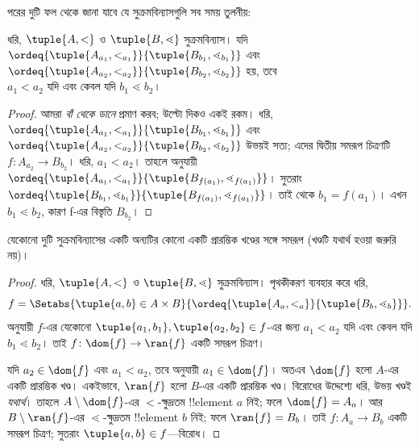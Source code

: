 \documentclass[../../../include/open-logic-section]{subfiles}
\begin{document}
পরের দুটি ফল থেকে জানা যাবে যে সুক্রমবিন্যাসগুলি
সব সময় তুলনীয়:

\begin{lem}
ধরি, $\tuple{A, <}$ ও $\tuple{B, \lessdot}$
সুক্রমবিন্যাস। যদি
$\ordeq{\tuple{A_{a_1}, <_{a_1}}}{\tuple{B_{b_1}, \lessdot_{b_1}}}$
এবং
$\ordeq{\tuple{A_{{a_2}}, <_{a_2}}}{\tuple{B_{{b_2}},
\lessdot_{b_2}}}$ হয়, তবে ${a_1}  < {a_2} \text{ যদি এবং কেবল যদি }{b_1} \lessdot
{b_2}$।
\end{lem}

\begin{proof}
আমরা \emph{বাঁ থেকে ডানে} প্রমাণ করব; উল্টো দিকও
একই রকম। ধরি,
$\ordeq{\tuple{A_{a_1}, <_{a_1}}}{\tuple{B_{b_1},
\lessdot_{b_1}}}$ এবং
$\ordeq{\tuple{A_{{a_2}},
<_{a_2}}}{\tuple{B_{{b_2}}, \lessdot_{b_2}}}$
উভয়ই সত্য; এদের দ্বিতীয় সমরূপ চিত্রণটি
$f \colon A_{{a_2}} \to B_{{b_2}}$। ধরি,
${a_1} < {a_2}$। তাহলে
 অনুযায়ী
$\ordeq{\tuple{A_{a_1}, <_{a_1}}}{\tuple{B_{f({a_1})},
\lessdot_{f({a_1})}}}$। সুতরাং
$\ordeq{\tuple{B_{b_1}, \lessdot_{b_1}}}{\tuple{B_{f({a_1})},
\lessdot_{f({a_1})}}}$। তাই
 থেকে
${b_1} = f({a_1})$। এখন
${b_1} \lessdot {b_2}$, কারণ f-এর বিস্তৃতি
$B_{{b_2}}$।
\end{proof}

\begin{thm}
যেকোনো দুটি সুক্রমবিন্যাসের একটি অন্যটির
কোনো একটি প্রারম্ভিক খণ্ডের সঙ্গে সমরূপ
(খণ্ডটি যথার্থ হওয়া জরুরি নয়)।
\end{thm}

\begin{proof}
ধরি, $\tuple{A, <}$ ও $\tuple{B, \lessdot}$
সুক্রমবিন্যাস। পৃথকীকরণ ব্যবহার করে ধরি,
\[
	f = \Setabs{\tuple{a, b} \in A \times B}{
		\ordeq{\tuple{A_a, <_a}}{\tuple{B_b, \lessdot_b}}}.
\]
 অনুযায়ী $f$-এর যেকোনো
$\tuple{a_1, b_1}, \tuple{a_2, b_2} \in f$-এর
জন্য $a_1 < a_2$ যদি এবং কেবল যদি
$b_1 \lessdot b_2$। তাই
$f \colon \dom{f} \to \ran{f}$ একটি সমরূপ
চিত্রণ।

যদি $a_2 \in \dom{f}$ এবং $a_1 < a_2$, তবে
 অনুযায়ী
$a_1 \in \dom{f}$। অতএব $\dom{f}$ হলো
$A$-এর একটি প্রারম্ভিক খণ্ড। একইভাবে,
$\ran{f}$ হলো $B$-এর একটি প্রারম্ভিক খণ্ড।
বিরোধের উদ্দেশ্যে ধরি, উভয় খণ্ডই
\emph{যথার্থ}। তাহলে $A \setminus \dom{f}$-এর
$<$-ক্ষুদ্রতম !!{element} $a$ নিই; ফলে
$\dom{f} = A_a$। আর $B \setminus \ran{f}$-এর
$\lessdot$-ক্ষুদ্রতম !!{element} $b$ নিই; ফলে
$\ran{f} = B_b$। তাই $f \colon A_a \to B_b$
একটি সমরূপ চিত্রণ; সুতরাং
$\tuple{a, b} \in f$—বিরোধ।
\end{proof}
\end{document}
